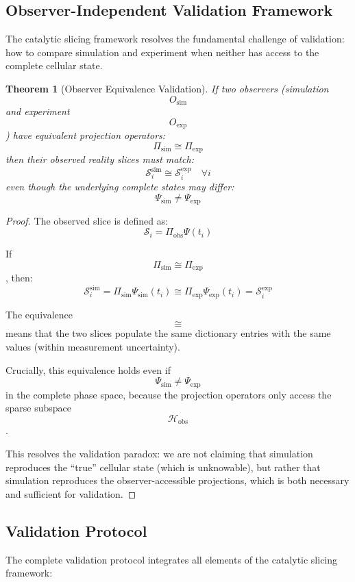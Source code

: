 \documentclass[11pt,twocolumn,a4paper]{article}
\newtheorem{theorem}{Theorem}[section]
\theoremstyle{remark}
\begin{document}
\subsection{Observer-Independent Validation Framework}

The catalytic slicing framework resolves the fundamental challenge of validation: how to compare simulation and experiment when neither has access to the complete cellular state.

\begin{theorem}[Observer Equivalence Validation]
\label{thm:observer_equivalence}
If two observers (simulation $$O_{\mathrm{sim}}$$ and experiment $$O_{\mathrm{exp}}$$) have equivalent projection operators:
$$
\Pi_{\mathrm{sim}} \cong \Pi_{\mathrm{exp}}
$$
then their observed reality slices must match:
$$
\mathcal{S}_i^{\mathrm{sim}} \cong \mathcal{S}_i^{\mathrm{exp}} \quad \forall i
$$
even though the underlying complete states may differ:
$$
\Psi_{\mathrm{sim}} \neq \Psi_{\mathrm{exp}}
$$
\end{theorem}

\begin{proof}
The observed slice is defined as:
$$
\mathcal{S}_i = \Pi_{\mathrm{obs}} \Psi(t_i)
$$

If $$\Pi_{\mathrm{sim}} \cong \Pi_{\mathrm{exp}}$$, then:
$$
\mathcal{S}_i^{\mathrm{sim}} = \Pi_{\mathrm{sim}} \Psi_{\mathrm{sim}}(t_i) \cong \Pi_{\mathrm{exp}} \Psi_{\mathrm{exp}}(t_i) = \mathcal{S}_i^{\mathrm{exp}}
$$

The equivalence $$\cong$$ means that the two slices populate the same dictionary entries with the same values (within measurement uncertainty).

Crucially, this equivalence holds even if $$\Psi_{\mathrm{sim}} \neq \Psi_{\mathrm{exp}}$$ in the complete phase space, because the projection operators only access the sparse subspace $$\mathcal{H}_{\mathrm{obs}}$$.

This resolves the validation paradox: we are not claiming that simulation reproduces the ``true'' cellular state (which is unknowable), but rather that simulation reproduces the observer-accessible projections, which is both necessary and sufficient for validation.
\end{proof}

\subsection{Validation Protocol}

The complete validation protocol integrates all elements of the catalytic slicing framework:
\end{document}
